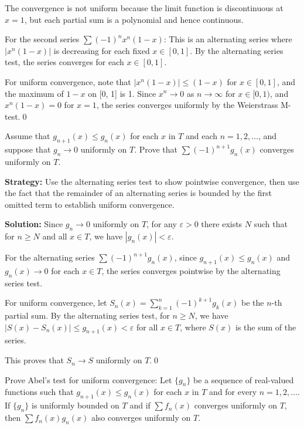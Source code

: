 The convergence is not uniform because the limit function is discontinuous at \( x = 1 \), but each partial sum is a polynomial and hence continuous.

For the second series \( \sum (-1)^n x^n (1 - x) \): This is an alternating series where \( |x^n (1 - x)| \) is decreasing for each fixed \( x \in [0, 1] \). By the alternating series test, the series converges for each \( x \in [0, 1] \).

For uniform convergence, note that \( |x^n (1 - x)| \leq (1 - x) \) for \( x \in [0, 1] \), and the maximum of \( 1 - x \) on [0, 1] is 1. Since \( x^n \to 0 \) as \( n \to \infty \) for \( x \in [0, 1) \), and \( x^n (1 - x) = 0 \) for \( x = 1 \), the series converges uniformly by the Weierstrass M-test.\qed


\begin{problembox}
Assume that \( g_{n+1}(x) \leq g_n(x) \) for each \( x \) in \( T \) and each \( n = 1, 2, \ldots \), and suppose that \( g_n \to 0 \) uniformly on \( T \). Prove that \( \sum (-1)^{n+1} g_n(x) \) converges uniformly on \( T \).
\end{problembox}

\noindent\textbf{Strategy:} Use the alternating series test to show pointwise convergence, then use the fact that the remainder of an alternating series is bounded by the first omitted term to establish uniform convergence.

\bigskip\noindent\textbf{Solution:} Since \( g_n \to 0 \) uniformly on \( T \), for any \( \varepsilon > 0 \) there exists \( N \) such that for \( n \geq N \) and all \( x \in T \), we have \( |g_n(x)| < \varepsilon \).

For the alternating series \( \sum (-1)^{n+1} g_n(x) \), since \( g_{n+1}(x) \leq g_n(x) \) and \( g_n(x) \to 0 \) for each \( x \in T \), the series converges pointwise by the alternating series test.

For uniform convergence, let \( S_n(x) = \sum_{k=1}^n (-1)^{k+1} g_k(x) \) be the \( n \)-th partial sum. By the alternating series test, for \( n \geq N \), we have \( |S(x) - S_n(x)| \leq g_{n+1}(x) < \varepsilon \) for all \( x \in T \), where \( S(x) \) is the sum of the series.

This proves that \( S_n \to S \) uniformly on \( T \).\qed




\begin{problembox}
Prove Abel's test for uniform convergence: Let \( \{g_n\} \) be a sequence of real-valued functions such that \( g_{n+1}(x) \leq g_n(x) \) for each \( x \) in \( T \) and for every \( n = 1, 2, \ldots \). If \( \{g_n\} \) is uniformly bounded on \( T \) and if \(\sum f_n(x)\) converges uniformly on \( T \), then \(\sum f_n(x)g_n(x)\) also converges uniformly on \( T \).
\end{problembox}

